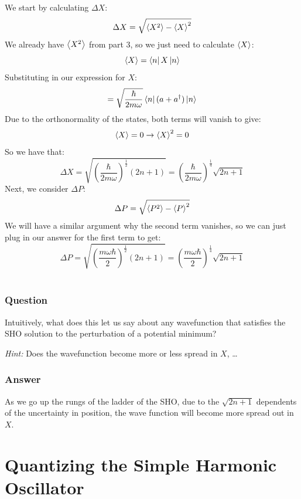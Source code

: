 \documentclass[12pt]{article}
\begin{document}
We start by calculating \(\Delta X\):
\begin{equation}
    \Delta X = \sqrt{\ev{X^2} - \ev{X}^2}
\end{equation}
We already have \(\ev{X^2}\) from part 3, so we just need to calculate \(\ev{X}\):
\begin{equation}
    \ev{X} = \bra{n}X\ket{n}
\end{equation}
Substituting in our expression for \(X\):
\begin{equation}
    = \sqrt{\frac{\hbar}{2m\omega}}\bra{n}(a + a^{\dagger})\ket{n}
\end{equation}
Due to the orthonormality of the states, both terms will vanish to give:
\begin{equation}
    \ev{X} = 0 \rightarrow \ev{X}^2 = 0
\end{equation}
So we have that:
\begin{equation}
    \Delta X = \sqrt{(\frac{\hbar}{2m\omega})^{\frac{1}{2}}(2n + 1)} =\boxed{\left(\frac{\hbar}{2m\omega}\right)^{\frac{1}{4}}\sqrt{2n + 1}}
\end{equation}
Next, we consider \(\Delta P\):
\begin{equation}
    \Delta P = \sqrt{\ev{P^2} - \ev{P}^2}
\end{equation}
We will have a similar argument why the second term vanishes, so we can just plug in our answer for the first term to get:
\begin{equation}
    \Delta P = \sqrt{(\frac{m\omega\hbar}{2})^{\frac{1}{2}}(2n + 1)} =\boxed{\left(\frac{m\omega\hbar}{2}\right)^{\frac{1}{4}}\sqrt{2n + 1}}
\end{equation}
\\
\subsubsection{Question}
Intuitively, what does this let us say about any wavefunction that satisfies the SHO solution to the perturbation of a potential minimum?

\textit{Hint:} Does the wavefunction become more or less spread in \(X\), \ldots
\subsubsection{Answer}
As we go up the rungs of the ladder of the SHO, due to the $\sqrt{2n +1}$ dependents of the uncertainty in position, the wave function will become more spread out in $X$.
\section{Quantizing the Simple Harmonic Oscillator}
\end{document}
